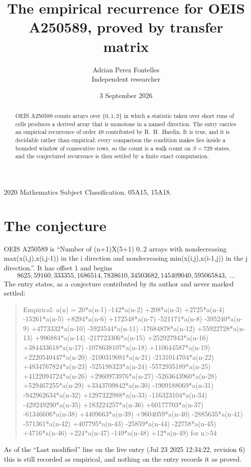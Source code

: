 \documentclass[11pt,a4paper]{article}
\title{The empirical recurrence for OEIS A250589, proved by transfer matrix}
\author{Adrian Perez Fontelles\\ \small Independent researcher}
\date{3 September 2026}
\theoremstyle{plain}
\theoremstyle{definition}
\begin{document}
\maketitle

\begin{abstract}
OEIS A250589 counts arrays over $\{0,1,2\}$ in which a statistic taken over short runs
of cells produces a derived array that is monotone in a named direction. The entry carries an
empirical recurrence of order $49$ contributed by R.~H.~Hardin. It is true, and it is
decidable rather than empirical: every comparison the condition makes lies inside a bounded
window of consecutive rows, so the count is a walk count on $S=729$ states, and the
conjectured recurrence is then settled by a finite exact computation.
\end{abstract}

\noindent\small 2020 Mathematics Subject Classification. 05A15, 15A18.\normalsize

\section{The conjecture}

OEIS A250589 is ``Number of (n+1)X(5+1) 0..2 arrays with nondecreasing max(x(i,j),x(i,j-1)) in the i direction and nondecreasing min(x(i,j),x(i-1,j)) in the j direction.''. It has offset $1$ and begins
\[
8625, 59160, 333355, 1686514, 7838610, 34503682, 145409040, 595065843,\ \dots
\]
The entry states, as a conjecture contributed by its author and never marked settled:
\begin{quote}
Empirical: a(n) = 20*a(n-1) -142*a(n-2) +208*a(n-3) +2725*a(n-4) -15261*a(n-5) +8294*a(n-6) +172548*a(n-7) -521171*a(n-8) -395240*a(n-9) +4773332*a(n-10) -5923544*a(n-11) -17684878*a(n-12) +55922728*a(n-13) +996884*a(n-14) -217723306*a(n-15) +252927943*a(n-16) +384433618*a(n-17) -1078638107*a(n-18) +110644587*a(n-19) +2220540447*a(n-20) -2100319081*a(n-21) -2131014704*a(n-22) +4834767824*a(n-23) -525198323*a(n-24) -5572935189*a(n-25) +4122094724*a(n-26) +2960973976*a(n-27) -5263643960*a(n-28) +529467255*a(n-29) +3343709842*a(n-30) -1909188069*a(n-31) -942962634*a(n-32) +1297322988*a(n-33) -116323104*a(n-34) -429249290*a(n-35) +183224257*a(n-36) +60177703*a(n-37) -61346606*a(n-38) +4409663*a(n-39) +9604059*a(n-40) -2885635*a(n-41) -571361*a(n-42) +407795*a(n-43) -25859*a(n-44) -22758*a(n-45) +4716*a(n-46) +224*a(n-47) -149*a(n-48) +12*a(n-49) for n>54
\end{quote}
As of the ``Last modified'' line on the live entry (Jul 23 2025 12:34:22, revision 6) this is still
recorded as empirical, and nothing on the entry records it as proved.
\end{document}
